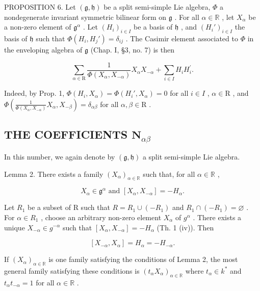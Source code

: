 PROPOSITION 6. Let \((\mathfrak{g},\mathfrak{h})\) be a split semi-simple Lie algebra, \(\varPhi\) a nondegenerate invariant symmetric bilinear form on \(\mathfrak{g}\) . For all \(\alpha \in \mathbb{R}\) , let \(X_{\alpha}\) be a non-zero element of \(\mathfrak{g}^{\alpha}\) . Let \((H_i)_{i\in I}\) be a basis of \(\mathfrak{h}\) , and \((H_i')_{i\in I}\) the basis of \(\mathfrak{h}\) such that \(\varPhi(H_i,H_j') = \delta_{ij}\) . The Casimir element associated to \(\varPhi\) in the enveloping algebra of \(\mathfrak{g}\) (Chap. I, §3, no. 7) is then

\[
\sum_ {\alpha \in \mathrm{R}} \frac {1}{\varPhi (X _ {\alpha} , X _ {- \alpha})} X _ {\alpha} X _ {- \alpha} + \sum_ {i \in I} H _ {i} H _ {i} ^ {\prime}.
\]

Indeed, by Prop. 1, \(\Phi(H_i, X_\alpha) = \Phi(H_i', X_\alpha) = 0\) for all \(i \in I\) , \(\alpha \in \mathrm{R}\) , and \(\Phi\left(\frac{1}{\Phi(X_\alpha, X_{-\alpha})} X_\alpha, X_{-\beta}\right) = \delta_{\alpha\beta}\) for all \(\alpha, \beta \in \mathrm{R}\) .

\subsection{\texorpdfstring{THE COEFFICIENTS \(\mathbf{N}_{\alpha \beta}\)}{THE COEFFICIENTS \textbackslash mathbf\{N\}\_\{\textbackslash alpha \textbackslash beta\}}}

In this number, we again denote by \((\mathfrak{g},\mathfrak{h})\) a split semi-simple Lie algebra.

Lemma 2. There exists a family \((X_{\alpha})_{\alpha \in \mathbb{R}}\) such that, for all \(\alpha \in \mathbb{R}\) ,

\[
X _ {\alpha} \in \mathfrak {g} ^ {\alpha} \text { and } [ X _ {\alpha}, X _ {- \alpha} ] = - H _ {\alpha}.
\]

Let \(R_{1}\) be a subset of R such that \(R = R_{1} \cup (-R_{1})\) and \(R_{1} \cap (-R_{1}) = \varnothing\) . For \(\alpha \in R_{1}\) , choose an arbitrary non-zero element \(X_{\alpha}\) of \(g^{\alpha}\) . There exists a unique \(X_{-\alpha} \in g^{-\alpha}\) such that \([X_{\alpha}, X_{-\alpha}] = -H_{\alpha}\) (Th. 1 (iv)). Then

\[
\left[ X _ {- \alpha}, X _ {\alpha} \right] = H _ {\alpha} = - H _ {- \alpha}.\tag{Q.E.D.}
\]

If \((X_{\alpha})_{\alpha \in \mathbb{R}}\) is one family satisfying the conditions of Lemma 2, the most general family satisfying these conditions is \((t_{\alpha}X_{\alpha})_{\alpha \in \mathbb{R}}\) where \(t_{\alpha}\in k^{*}\) and \(t_{\alpha}t_{-\alpha} = 1\) for all \(\alpha \in \mathbb{R}\) .

